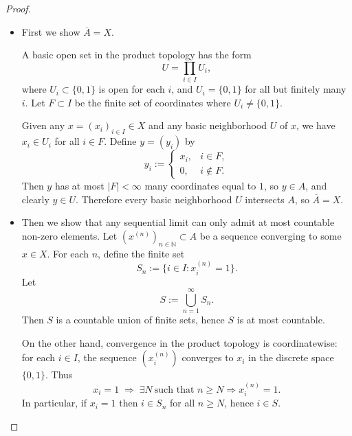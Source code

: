 \documentclass[12pt]{article}
\renewcommand{\(}{\left(}%
\renewcommand{\)}{\right)}%
\renewcommand{\[}{\left[}%
\renewcommand{\]}{\right]}%
\newtheorem{proof}{Proof.}}
\begin{document}
\begin{proof}
\begin{itemize}
\begin{itemize}
	\item First we show $\overline{A} = X$.

A basic open set in the product topology has the form
\begin{equation*}
U = \prod_{i\in I} U_i,
\end{equation*}
where $U_i\subset\{0,1\}$ is open for each $i$, and $U_i=\{0,1\}$ for all but finitely many $i$. Let $F\subset I$ be the finite set of coordinates where $U_i\neq\{0,1\}$.

Given any $x=(x_i)_{i\in I}\in X$ and any basic neighborhood $U$ of $x$, we have $x_i\in U_i$ for all $i\in F$. Define $y=(y_i)$ by
\begin{equation*}
y_i :=
\begin{cases}
x_i, & i\in F, \\
0,   & i\notin F.
\end{cases}
\end{equation*}
Then $y$ has at most $|F|<\infty$ many coordinates equal to $1$, so $y\in A$, and clearly $y\in U$. Therefore every basic neighborhood $U$ intersects $A$, so $\overline{A} = X$.

	\item Then we show that any sequential limit can only admit at most countable non-zero elements. Let $(x^{(n)})_{n\in\mathbb{N}}\subset A$ be a sequence converging to some $x\in X$. For each $n$, define the finite set
\begin{equation*}
S_n := \{ i\in I : x^{(n)}_i = 1 \}.
\end{equation*}
Let
\begin{equation*}
S := \bigcup_{n=1}^\infty S_n.
\end{equation*}
Then $S$ is a countable union of finite sets, hence $S$ is at most countable.

On the other hand, convergence in the product topology is coordinatewise: for each $i\in I$, the sequence $(x^{(n)}_i)$ converges to $x_i$ in the discrete space $\{0,1\}$. Thus
\begin{equation*}
x_i = 1 \;\Rightarrow\; \exists N\ \text{such that }n\ge N \Rightarrow x^{(n)}_i = 1.
\end{equation*}
In particular, if $x_i=1$ then $i\in S_n$ for all $n\ge N$, hence $i\in S$.  


\end{itemize}
\end{itemize}
\end{proof}
\end{document}
